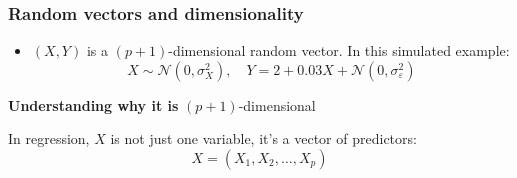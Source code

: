 \documentclass[
  letterpaper,
  DIV=11,
  numbers=noendperiod]{scrartcl}
\providecommand{\tightlist}{%
  \setlength{\itemsep}{0pt}\setlength{\parskip}{0pt}}\usepackage{longtable,booktabs,array}
\begin{document}
\subsubsection{Random vectors and
dimensionality}\label{random-vectors-and-dimensionality}

\begin{itemize}
\tightlist
\item
  \((X, Y)\) is a \((p + 1)\)-dimensional random vector. In this
  simulated example:
  \[ X \sim \mathcal{N}(0, \sigma_X^2), \quad Y = 2 + 0.03X + \mathcal{N}(0, \sigma_\varepsilon^2) \]
\end{itemize}

\textbf{Understanding why it is} \((p + 1)\)-dimensional

In regression, \(X\) is not just one variable, it's a vector of
predictors: \[ X = (X_1, X_2, \dots, X_p) \]

\newpage
\end{document}
